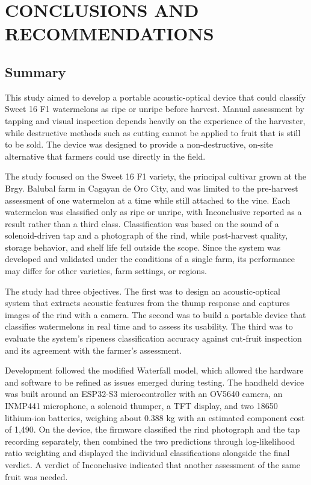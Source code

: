 \chapter{CONCLUSIONS AND RECOMMENDATIONS}

\begin{thesisprose}

\section{Summary}

This study aimed to develop a portable acoustic-optical device that could classify Sweet 16 F1 watermelons as ripe or unripe before harvest. Manual assessment by tapping and visual inspection depends heavily on the experience of the harvester, while destructive methods such as cutting cannot be applied to fruit that is still to be sold. The device was designed to provide a non-destructive, on-site alternative that farmers could use directly in the field.

The study focused on the Sweet 16 F1 variety, the principal cultivar grown at the Brgy. Balubal farm in Cagayan de Oro City, and was limited to the pre-harvest assessment of one watermelon at a time while still attached to the vine. Each watermelon was classified only as ripe or unripe, with Inconclusive reported as a result rather than a third class. Classification was based on the sound of a solenoid-driven tap and a photograph of the rind, while post-harvest quality, storage behavior, and shelf life fell outside the scope. Since the system was developed and validated under the conditions of a single farm, its performance may differ for other varieties, farm settings, or regions.

The study had three objectives. The first was to design an acoustic-optical system that extracts acoustic features from the thump response and captures images of the rind with a camera. The second was to build a portable device that classifies watermelons in real time and to assess its usability. The third was to evaluate the system's ripeness classification accuracy against cut-fruit inspection and its agreement with the farmer's assessment.

Development followed the modified Waterfall model, which allowed the hardware and software to be refined as issues emerged during testing. The handheld device was built around an ESP32-S3 microcontroller with an OV5640 camera, an INMP441 microphone, a solenoid thumper, a TFT display, and two 18650 lithium-ion batteries, weighing about 0.388 kg with an estimated component cost of \pesos{}1,490. On the device, the firmware classified the rind photograph and the tap recording separately, then combined the two predictions through log-likelihood ratio weighting and displayed the individual classifications alongside the final verdict. A verdict of Inconclusive indicated that another assessment of the same fruit was needed.


\end{thesisprose}
